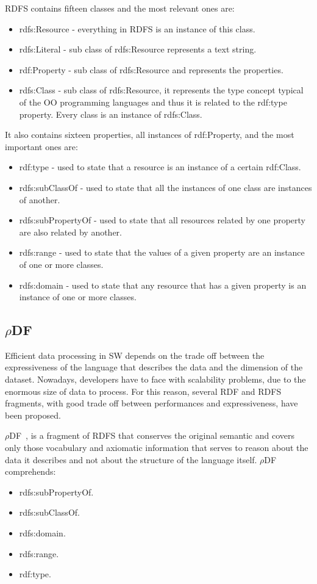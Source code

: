 RDFS contains fifteen classes and the most relevant ones are:

\begin{itemize}
\item rdfs:Resource - everything in RDFS is an instance of this class.
\item rdfs:Literal  -  sub class of rdfs:Resource represents a text string.
\item rdf:Property  -  sub class of rdfs:Resource and represents the properties.
\item rdfs:Class    -  sub class of rdfs:Resource, it represents the type concept typical of the OO programming languages and thus it is related to the rdf:type property. Every class is an instance of rdfs:Class.
\end{itemize}

It also contains sixteen properties, all instances of rdf:Property, and the most important ones are:
\begin{itemize}
\item rdf:type - used to state that a resource is an instance of a certain rdf:Class.
\item rdfs:subClassOf - used to state that all the instances of one class are instances of another.
\item rdfs:subPropertyOf - used to state that all resources related by one property are also related by another.
\item rdfs:range - used to state that the values of a given property are an instance of one or more classes.
\item rdfs:domain -  used to state that any resource that has a given property is an instance of one or more classes.
\end{itemize}


\subsection{$\rho$DF}\label{sec:rhodf}

Efficient data processing in SW depends on the trade off between the expressiveness of the language that describes the data and the dimension of the dataset. Nowadays, developers have to face with scalability problems, due to the enormous size of data to process. For this reason, several RDF and RDFS fragments, with good trade off between performances and expressiveness, have been proposed.

$\rho$DF~\cite{DBLP:conf/esws/MunozPG07}, is a fragment of RDFS that conserves the original semantic and covers only those vocabulary and axiomatic information that  serves to reason about the data it describes and not about the structure of the language itself. $\rho$DF comprehends:
\begin{itemize}
\item rdfs:subPropertyOf.
\item rdfs:subClassOf.
\item rdfs:domain.
\item rdfs:range.
\item rdf:type. 
\end{itemize}

